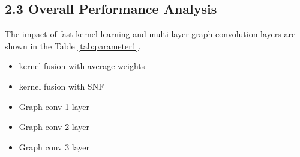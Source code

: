 \documentclass[fleqn,10pt]{wlscirep}
\begin{document}

\subsection*{2.3 Overall Performance Analysis}
The impact of fast kernel learning and multi-layer graph convolution layers are shown in the Table \ref{tab:parameter1}.
\begin{itemize}
\item kernel fusion with average weights
\item kernel fusion with SNF
\item Graph conv 1 layer
\item Graph conv 2 layer
\item Graph conv 3 layer
\end{itemize}
\end{document}

